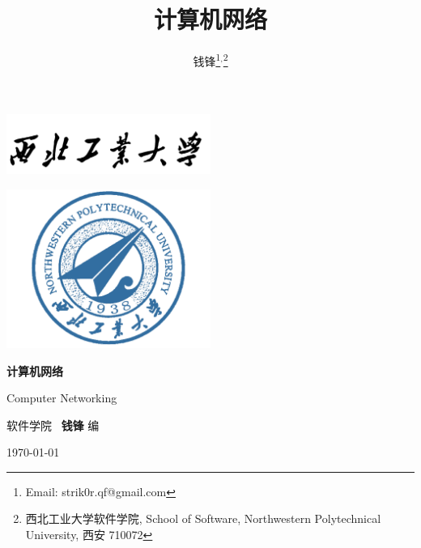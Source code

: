 \documentclass[10pt,UTF8]{book} %
\title{\textbf{计算机网络}}
\author{钱锋\thanks{Email: strik0r.qf@gmail.com}${}^,$\thanks{
    西北工业大学软件学院, School of Software, Northwestern Polytechnical University, 西安 710072
}}
\begin{document}

\pagestyle{empty}
\begin{titlepage}
    \thispagestyle{empty}
    \centering
        \vspace*{2cm}
        \includegraphics[width=0.5\textwidth]{pic/npu_2.png}\par
        \vspace{1em}
        \includegraphics[width=0.5\textwidth]{pic/npu_1.png}\par
    \vspace{1cm}
        \begin{center}
            \Huge \heiti \textbf{计算机网络}

            Computer Networking
        \end{center}
        \vspace{15em}
        \begin{center}
        \songti
        \kaishu 软件学院 \, \heiti\textbf{钱锋} \quad \songti 编
        \vspace{0.5em}

    \today
    \end{center}
\end{titlepage}
\cleardoublepage
\maketitle
\cleardoublepage

\frontmatter
\newpage
\pagestyle{plain}
\makeatother

\pagestyle{plain}
{\tableofcontents}
\newpage
\thispagestyle{empty}
\cleardoublepage %


\makeatletter
\let\ps@plain\ps@empty
\makeatother
\end{document}
